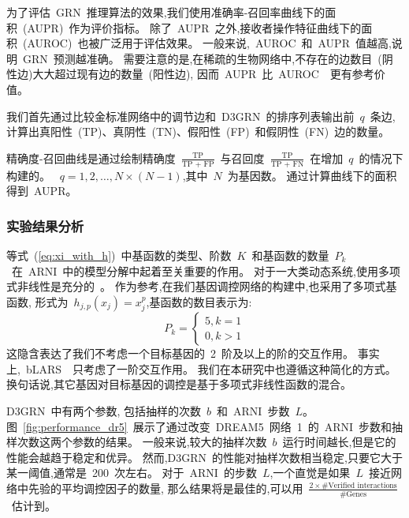 为了评估~GRN~推理算法的效果,我们使用准确率-召回率曲线下的面积~(AUPR)~作为评价指标。
除了~AUPR~之外,接收者操作特征曲线下的面积~(AUROC)~也被广泛用于评估效果。
一般来说,~AUROC~和~AUPR~值越高,说明~GRN~预测越准确。
需要注意的是,在稀疏的生物网络中,不存在的边数目~(阴性边)大大超过现有边的数量~(阳性边),
因而~AUPR~比~AUROC~\cite{saito2015precision}~更有参考价值。

我们首先通过比较金标准网络中的调节边和~D3GRN~的排序列表输出前~$q$~条边,
计算出真阳性~(TP)、真阴性~(TN)、假阳性~(FP)~和假阴性~(FN)~边的数量。

精确度-召回曲线是通过绘制精确度~$\frac{\text{TP}}{\text{TP + FP}}$~与召回度~$\frac{\text{TP}}{\text{TP + FN}}$~在增加~$q$~的情况下构建的。
~$q = 1,2,\ldots,N\times(N-1)$,其中~$N$~为基因数。
通过计算曲线下的面积得到~AUPR。


\subsubsection{实验结果分析}

等式~(\ref{eq:xi_with_h})~中基函数的类型、阶数~$K$~和基函数的数量~$P_k$~在~ARNI~中的模型分解中起着至关重要的作用。
对于一大类动态系统,使用多项式非线性是充分的~\cite{mangan2016inferring}。
作为参考,在我们基因调控网络的构建中,也采用了多项式基函数,
形式为~$h_{j,p}(x_j)=x_j^p$,基函数的数目表示为: 
\begin{equation}
P_k=\left\{\begin{matrix}
5,  k=1\\ 
0,  k>1
\end{matrix}\right. 
\end{equation}
这隐含表达了我们不考虑一个目标基因的~2~阶及以上的阶的交互作用。
事实上,~bLARS~\cite{singh2016blars}~只考虑了一阶交互作用。
我们在本研究中也遵循这种简化的方式。
换句话说,其它基因对目标基因的调控是基于多项式非线性函数的混合。

D3GRN~中有两个参数,
包括抽样的次数~$b$~和~ARNI~步数~$L$。
图~\ref{fig:performance_dr5}~展示了通过改变~DREAM5~网络~1~的~ARNI~步数和抽样次数这两个参数的结果。
一般来说,较大的抽样次数~$b$~运行时间越长,但是它的性能会越趋于稳定和优异。
然而,D3GRN~的性能对抽样次数相当稳定,只要它大于某一阈值,通常是~200~次左右。
对于~ARNI~的步数~$L$,一个直觉是如果~$L$~接近网络中先验的平均调控因子的数量,
那么结果将是最佳的,可以用~$\frac{2  \times \#\text{Verified interactions}}{\#\text{Genes}}$~估计到。
 
